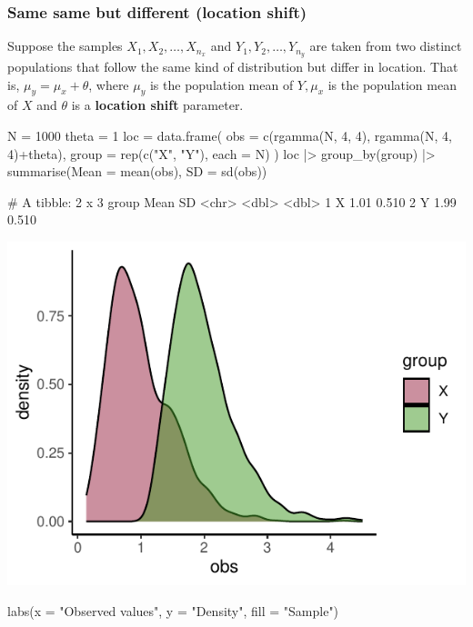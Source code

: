 \documentclass[a4paper]{article}\usepackage[]{graphicx}\usepackage[]{xcolor}
\makeatletter
\def\maxwidth{ %
  \ifdim\Gin@nat@width>\linewidth
    \linewidth
  \else
    \Gin@nat@width
  \fi
}
\makeatother
\begin{document}
\subsubsection{Same same but different (location shift)}
Suppose the samples \( X_1,X_2,\dots,X_{n_x} \) and \( Y_1,Y_2,\dotsc,Y_{n_y} \) are taken from two distinct populations that follow the same kind of distribution but differ in location.
That is, \( \mu_y = \mu_x + \theta \), where \( \mu_y \) is the population mean of \( Y, \mu_x \) is the population mean of \( X \) and \( \theta \) is a \textcolor{mygreen}{\textbf{location shift}} parameter.
\begin{Schunk}
\begin{Sinput}
N = 1000
theta = 1
loc = data.frame(
obs = c(rgamma(N, 4, 4),
				rgamma(N, 4, 4)+theta),
group = rep(c("X", "Y"), each = N)
)
loc |> group_by(group) |> 
	   summarise(Mean = mean(obs),
       SD = sd(obs))
\end{Sinput}
\begin{Soutput}
# A tibble: 2 x 3
  group  Mean    SD
  <chr> <dbl> <dbl>
1 X      1.01 0.510
2 Y      1.99 0.510
\end{Soutput}
\end{Schunk}
\begin{Schunk}


{\centering \includegraphics[width=\maxwidth]{figure/listings-unnamed-chunk-118-1} 

}

\begin{Sinput}
labs(x = "Observed values", 
	 y = "Density", 
   	 fill = "Sample")
\end{Sinput}
\end{Schunk}
\end{document}
